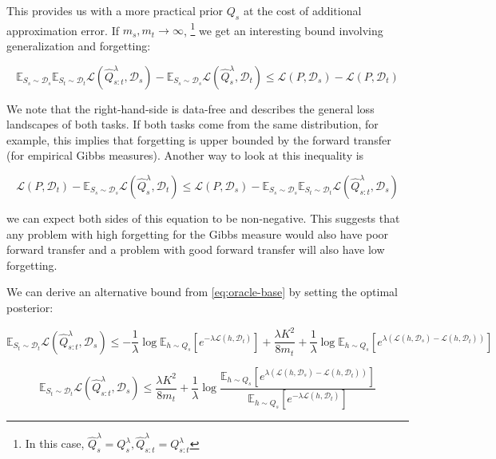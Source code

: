 \documentclass[letterpaper]{article}
\theoremstyle{definition}
\begin{document}
This provides us with a more practical prior $Q_s$ at the cost of additional approximation error.
If $m_s,m_t\rightarrow \infty$, \footnote{In this case, $\hat{Q}^\lambda_s=Q^\lambda_s, \hat{Q}^{\lambda}_{s:t}=Q^{\lambda}_{s:t}$} we get an interesting bound involving generalization and forgetting:

\begin{equation}
\mathbb{E}_{S_s\sim \mathcal{D}_s}\mathbb{E}_{S_t\sim \mathcal{D}_t}\mathcal{L}( \hat{Q}^{\lambda}_{s:t},\mathcal{D}_s)-\mathbb{E}_{S_s\sim \mathcal{D}_s}\mathcal{L}(\hat{Q}^\lambda_s,\mathcal{D}_t)\leq \mathcal{L}(P,\mathcal{D}_s)-\mathcal{L}(P,\mathcal{D}_t)
\end{equation}

We note that the right-hand-side is data-free and describes the general loss landscapes of both tasks. If both tasks come from the same distribution, for example, this implies that forgetting is upper bounded by the forward transfer (for empirical Gibbs measures).
Another way to look at this inequality is 

\begin{equation*}
\mathcal{L}(P,\mathcal{D}_t)-\mathbb{E}_{S_s\sim \mathcal{D}_s}\mathcal{L}(\hat{Q}^\lambda_s,\mathcal{D}_t)\leq \mathcal{L}(P,\mathcal{D}_s)-\mathbb{E}_{S_s\sim \mathcal{D}_s}\mathbb{E}_{S_t\sim \mathcal{D}_t}\mathcal{L}( \hat{Q}^{\lambda}_{s:t},\mathcal{D}_s)
\end{equation*}

we can expect both sides of this equation to be non-negative. This suggests that any problem with high forgetting for the Gibbs measure would also have poor forward transfer and a problem with good forward transfer will also have low forgetting.

We can derive an alternative bound from \eqref{eq:oracle-base} by setting the optimal posterior:

\begin{equation} 
\mathbb{E}_{S_t\sim \mathcal{D}_t}\mathcal{L}( \hat{Q}^{\lambda}_{s:t},\mathcal{D}_s)\leq -\frac{1}{\lambda}\log \mathbb{E}_{h\sim Q_s}\left [e^{-\lambda\mathcal{L}(h,\mathcal{D}_t)}\right ]+\frac{\lambda K^2}{8m_t}+\frac{1}{\lambda}\log\mathbb{E}_{h\sim Q_s}\left [e^{\lambda(\mathcal{L}(h,\mathcal{D}_s)-\mathcal{L}(h,\mathcal{D}_t))} \right ]
\end{equation}

$$
\mathbb{E}_{S_t\sim \mathcal{D}_t}\mathcal{L}( \hat{Q}^{\lambda}_{s:t},\mathcal{D}_s)\leq \frac{\lambda K^2}{8m_t}+\frac{1}{\lambda}\log\frac{\mathbb{E}_{h\sim Q_s}\left [e^{\lambda(\mathcal{L}(h,\mathcal{D}_s)-\mathcal{L}(h,\mathcal{D}_t))} \right ]}{\mathbb{E}_{h\sim Q_s}\left [e^{-\lambda\mathcal{L}(h,\mathcal{D}_t)}\right ]}
$$
\end{document}
